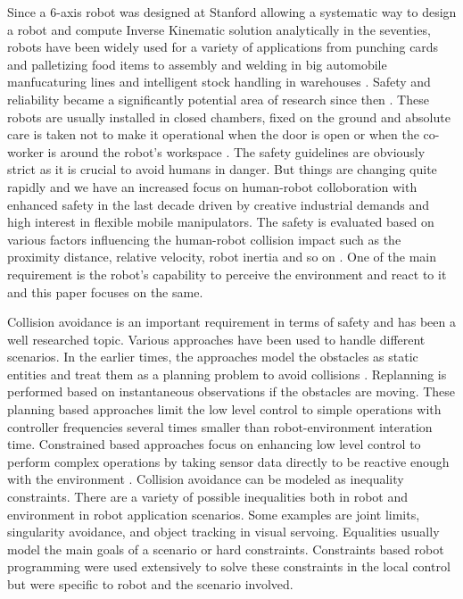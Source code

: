 Since a 6-axis robot was designed at Stanford allowing a systematic way to design a robot and compute Inverse Kinematic solution analytically in the seventies, robots have been widely used for a variety of applications from punching cards and palletizing food items to assembly and welding in big automobile manfucaturing lines and intelligent stock handling in warehouses \cite{scheinman1969design}. Safety and reliability became a significantly potential area of research since then \cite{dhillon2012robot}. These robots are usually installed in closed chambers, fixed on the ground and absolute care is taken not to make it operational when the door is open or when the co-worker is around the robot's workspace \cite{safetyreqs}.
The safety guidelines are obviously strict as it is crucial to avoid humans in danger. But things are changing quite rapidly and we have an increased focus on human-robot colloboration with enhanced safety in the last decade \cite{Bicchi2008,dhillon2012robot} driven by creative industrial demands and high interest in flexible mobile manipulators. The safety is evaluated based on various factors influencing the human-robot collision impact such as the proximity distance, relative velocity, robot inertia and so on \cite{Kulic2006}. One of the main requirement is the robot's capability to perceive the environment and react to it and this paper focuses on the same. 


Collision avoidance is an important requirement in terms of safety and has been a well researched topic. Various approaches have been used to handle different scenarios. In the earlier times, the approaches model the obstacles as static entities and treat them as a planning problem to avoid collisions \cite{van2011reciprocal}. Replanning is performed based on instantaneous observations if the obstacles are moving. These planning based approaches limit the low level control to simple operations with controller frequencies several times smaller than robot-environment interation time. Constrained based approaches focus on enhancing low level control to perform complex operations
by taking sensor data directly to be reactive enough with the environment \cite{khatib1986real}. Collision avoidance can be modeled as inequality constraints. There are a variety of possible inequalities both in robot and environment in robot application scenarios. Some examples are joint limits, singularity avoidance, and object tracking in visual servoing. Equalities usually model the main goals of a scenario or hard constraints. Constraints based robot programming were used extensively to solve these constraints in the local control but were specific to robot and the scenario involved. 
   
